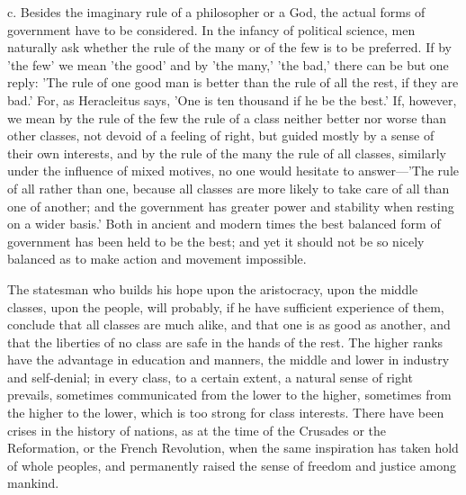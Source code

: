 \documentclass[11pt,letter]{article}
\begin{document}
\par  c. Besides the imaginary rule of a philosopher or a God, the actual forms of government have to be considered. In the infancy of political science, men naturally ask whether the rule of the many or of the few is to be preferred. If by 'the few' we mean 'the good' and by 'the many,' 'the bad,' there can be but one reply: 'The rule of one good man is better than the rule of all the rest, if they are bad.' For, as Heracleitus says, 'One is ten thousand if he be the best.' If, however, we mean by the rule of the few the rule of a class neither better nor worse than other classes, not devoid of a feeling of right, but guided mostly by a sense of their own interests, and by the rule of the many the rule of all classes, similarly under the influence of mixed motives, no one would hesitate to answer—'The rule of all rather than one, because all classes are more likely to take care of all than one of another; and the government has greater power and stability when resting on a wider basis.' Both in ancient and modern times the best balanced form of government has been held to be the best; and yet it should not be so nicely balanced as to make action and movement impossible.

\par  The statesman who builds his hope upon the aristocracy, upon the middle classes, upon the people, will probably, if he have sufficient experience of them, conclude that all classes are much alike, and that one is as good as another, and that the liberties of no class are safe in the hands of the rest. The higher ranks have the advantage in education and manners, the middle and lower in industry and self-denial; in every class, to a certain extent, a natural sense of right prevails, sometimes communicated from the lower to the higher, sometimes from the higher to the lower, which is too strong for class interests. There have been crises in the history of nations, as at the time of the Crusades or the Reformation, or the French Revolution, when the same inspiration has taken hold of whole peoples, and permanently raised the sense of freedom and justice among mankind.
\end{document}
